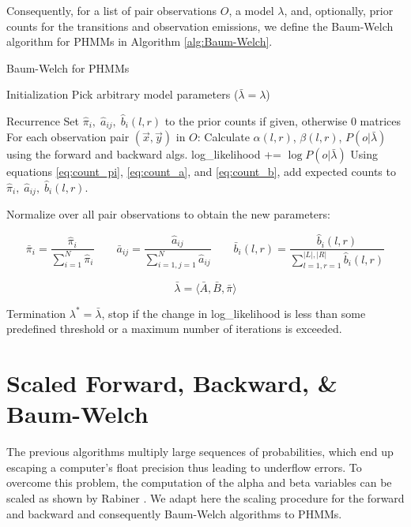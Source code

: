 \documentclass[a4paper,10pt]{article}
\begin{document}
Consequently, for a list of pair observations $O$, a model $\lambda$, and,
optionally, prior counts for the transitions and observation emissions, we
define the Baum-Welch algorithm for PHMMs in Algorithm \ref{alg:Baum-Welch}.

\vspace{0.4cm}
\begin{algorithm}[H]
\caption{Baum-Welch for PHMMs}
  \DontPrintSemicolon
{}
\BlankLine
{}
\BlankLine

Initialization\;
\BlankLine
\Indp Pick arbitrary model parameters ($\bar \lambda = \lambda$)\;
\BlankLine

\Indm Recurrence\;\Indp
\BlankLine
Set $\hat \pi_i,\; \hat a_{ij},\; \hat b_i(l, r)$ to the prior counts if given,
otherwise 0 matrices\;
For each observation pair $(\vec{x}, \vec{y})$ in $O$:\;\Indp
Calculate $\alpha(l,r)$, $\beta(l,r)$, $P(o | \bar\lambda)$ using the forward
and backward algs.\;
log\_likelihood += $\log P(o | \bar \lambda)$\;
Using equations \ref{eq:count_pi}, \ref{eq:count_a}, and \ref{eq:count_b}, add
expected counts to $\hat \pi_i,\; \hat a_{ij},\; \hat b_i(l, r)$.

\BlankLine
\Indm Normalize over all pair observations to obtain the new parameters:

$$\bar \pi_i = \frac{\hat \pi_i}{\displaystyle\sum_{i=1}^N \hat \pi_i} \qquad
\bar a_{ij} = \frac{\hat a_{ij}}{\displaystyle\sum_{i=1, j=1}^N \hat a_{ij}}
\qquad \bar b_i(l,r) = \frac{\hat b_i(l,r)}{\displaystyle\sum_{l=1, r=1}^{|L|, |R|}
  \hat b_i(l,r)}$$

$$\bar \lambda = \langle \bar A, \bar B, \bar \pi \rangle$$

\Indm Termination\;\Indp
\BlankLine
$\lambda^* = \bar\lambda$, stop if the change in log\_likelihood is less than some predefined threshold or a maximum number of iterations is
exceeded.
\BlankLine
\label{alg:Baum-Welch}
\end{algorithm}


\section{Scaled Forward, Backward, \& Baum-Welch}

The previous algorithms multiply large sequences of probabilities, which end up
escaping a computer's float precision thus leading to underflow errors. To
overcome this problem, the computation of the alpha and beta variables can be
scaled as shown by Rabiner \cite{Rabiner:HMMs}. We adapt here the scaling
procedure for the forward and backward and consequently Baum-Welch algorithms to
PHMMs.


{\small

}
\end{document}
